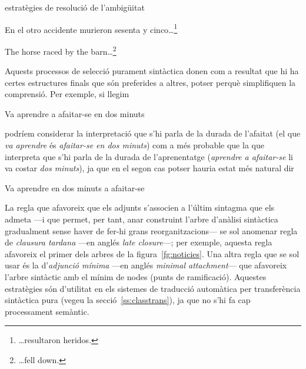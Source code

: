 \begin{persabermes}{estratègies de resolució de l'ambigüitat}
\begin{exemple}
  \end{exemple}
  \begin{exemple}
    En el otro accidente murieron sesenta y
    cinco\ldots\footnote{\ldots resultaron heridos.}
  \end{exemple}
  \begin{exemple}
    The horse raced by the barn\ldots\footnote{\ldots fell down.}
  \end{exemple}
  Aquests processos de selecció purament sintàctica donen com a
  resultat que hi ha certes estructures finals que són preferides a
  altres, potser perquè simplifiquen la comprensió.  Per exemple, si
  llegim
  \begin{exemple}
    Va aprendre a afaitar-se en dos minuts
  \end{exemple}
  podríem considerar la interpretació que s'hi parla de la durada de
  l'afaitat (el que \emph{va aprendre} és \emph{afaitar-se en dos
    minuts}) com a més probable que la que interpreta que s'hi parla
  de la durada de l'aprenentatge (\emph{aprendre a afaitar-se} li va
  costar \emph{dos minuts}), ja que en el segon cas potser hauria
  estat més natural dir
  \begin{exemple}
    Va aprendre en dos minuts a afaitar-se
  \end{exemple}
  La regla que afavoreix que els adjunts s'associen a l'últim sintagma
  que els admeta ---i que permet, per tant, anar construint l'arbre
  d'anàlisi sintàctica gradualment sense haver de fer-hi grans
  reorganitzacions--- se sol anomenar regla de \emph{clausura tardana}
  ---en anglés \emph{late closure}---; per exemple, aquesta regla
  afavoreix el primer dels arbres de la figura~\ref{fg:noticies}. Una
  altra regla que se sol usar és la d'\emph{adjunció mínima} ---en
  anglés \emph{minimal attachment}--- que afavoreix l'arbre sintàctic
  amb el mínim de nodes (punts de ramificació).  Aquestes estratègies
  són d'utilitat en els sistemes de traducció automàtica per
  transferència sintàctica pura (vegeu la secció~\ref{ss:classtrans}),
  ja que no s'hi fa cap processament semàntic.


\end{persabermes}
